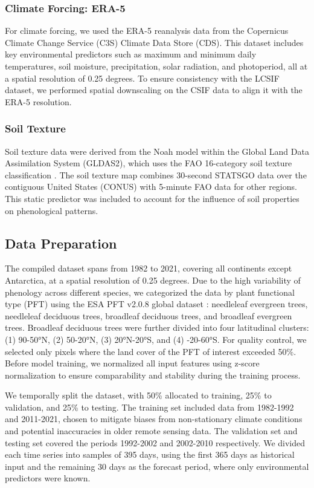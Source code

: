 \documentclass[pdflatex,sn-mathphys-num]{sn-jnl}%
\theoremstyle{thmstyleone}%
\theoremstyle{thmstyletwo}%
\theoremstyle{thmstylethree}%
\begin{document}
\subsubsection{Climate Forcing: ERA-5  }\label{subsubsec2}
For climate forcing, we used the ERA-5 reanalysis data from the Copernicus Climate Change Service (C3S) Climate Data Store (CDS)\cite{c3s_era5_2018}. This dataset includes key environmental predictors such as maximum and minimum daily temperatures, soil moisture, precipitation, solar radiation, and photoperiod, all at a spatial resolution of 0.25 degrees. To ensure consistency with the LCSIF dataset, we performed spatial downscaling on the CSIF data to align it with the ERA-5 resolution.

\subsubsection{Soil Texture }\label{subsubsec2}
Soil texture data were derived from the Noah model within the Global Land Data Assimilation System (GLDAS2), which uses the FAO 16-category soil texture classification
\cite{beaudoing_gldas_2019}. The soil texture map combines 30-second STATSGO data over the contiguous United States (CONUS) with 5-minute FAO data for other regions. This static predictor was included to account for the influence of soil properties on phenological patterns.
\subsection{Data Preparation}\label{subsec2}
The compiled dataset spans from 1982 to 2021, covering all continents except Antarctica, at a spatial resolution of 0.25 degrees. Due to the high variability of phenology across different species, we categorized the data by plant functional type (PFT) using the ESA PFT v2.0.8 global dataset \cite{harper_esa_2023}: needleleaf evergreen trees, needleleaf deciduous trees, broadleaf deciduous trees, and broadleaf evergreen trees. Broadleaf deciduous trees were further divided into four latitudinal clusters: (1) 90-50°N, (2) 50-20°N, (3) 20°N-20°S, and (4) -20-60°S. For quality control, we selected only pixels where the land cover of the PFT of interest exceeded 50\%. Before model training, we normalized all input features using z-score normalization to ensure comparability and stability during the training process.

We temporally split the dataset, with 50\% allocated to training, 25\% to validation, and 25\% to testing. The training set included data from 1982-1992 and 2011-2021, chosen to mitigate biases from non-stationary climate conditions and potential inaccuracies in older remote sensing data. The validation set and testing set covered the periods 1992-2002 and 2002-2010 respectively. We divided each time series into samples of 395 days, using the first 365 days as historical input and the remaining 30 days as the forecast period, where only environmental predictors were known.
\end{document}
